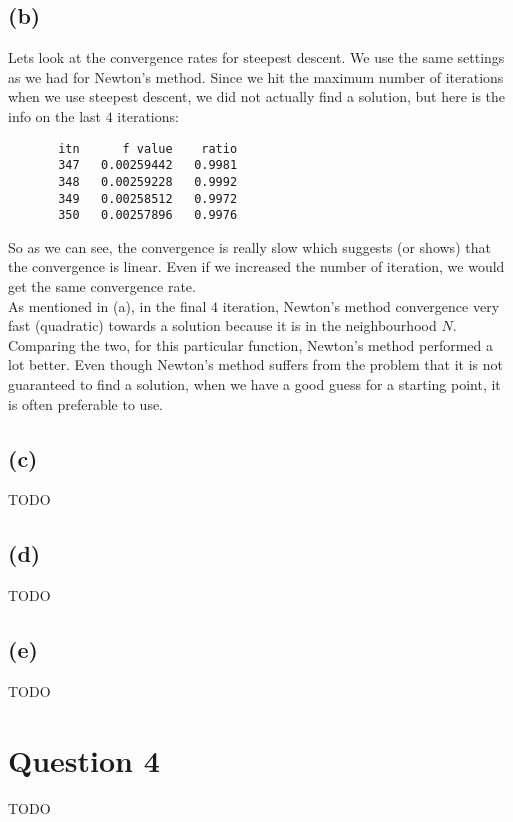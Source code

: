 \documentclass[a4paper, fleqn]{article}
\begin{document}
\subsection{(b)}
Lets look at the convergence rates for steepest descent. We use the same settings as we had for Newton's method. Since we hit the maximum number of iterations when we use steepest descent, we did not actually find a solution, but here is the info on the last $4$ iterations:
\begin{verbatim}
       itn      f value    ratio
       347   0.00259442   0.9981
       348   0.00259228   0.9992
       349   0.00258512   0.9972
       350   0.00257896   0.9976
\end{verbatim}
So as we can see, the convergence is really slow which suggests (or shows) that the convergence is linear. Even if we increased the number of iteration, we would get the same convergence rate. \\
As mentioned in (a), in the final $4$ iteration, Newton's method convergence very fast (quadratic) towards a solution because it is in the neighbourhood $N$. \\
Comparing the two, for this particular function, Newton's method performed a lot better. Even though Newton's method suffers from the problem that it is not guaranteed to find a solution, when we have a good guess for a starting point, it is often preferable to use.

\subsection{(c)}
TODO

\subsection{(d)}
TODO

\subsection{(e)}
TODO

\section{Question 4}
TODO
\end{document}

